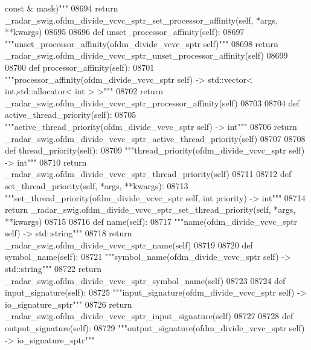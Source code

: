 \begin{DoxyCode}
{{{{{{{{{{{{{{{{{{{{{{{{{{{{{       const & mask)"""}
08694         \textcolor{keywordflow}{return} \_radar\_swig.ofdm\_divide\_vcvc\_sptr\_set\_processor\_affinity(self, *args, **kwargs)
08695 
08696     \textcolor{keyword}{def }unset_processor_affinity(self):
08697         \textcolor{stringliteral}{"""unset\_processor\_affinity(ofdm\_divide\_vcvc\_sptr self)"""}
08698         \textcolor{keywordflow}{return} \_radar\_swig.ofdm\_divide\_vcvc\_sptr\_unset\_processor\_affinity(self)
08699 
08700     \textcolor{keyword}{def }processor_affinity(self):
08701         \textcolor{stringliteral}{"""processor\_affinity(ofdm\_divide\_vcvc\_sptr self) -> std::vector< int,std::allocator< int > >"""}
08702         \textcolor{keywordflow}{return} \_radar\_swig.ofdm\_divide\_vcvc\_sptr\_processor\_affinity(self)
08703 
08704     \textcolor{keyword}{def }active_thread_priority(self):
08705         \textcolor{stringliteral}{"""active\_thread\_priority(ofdm\_divide\_vcvc\_sptr self) -> int"""}
08706         \textcolor{keywordflow}{return} \_radar\_swig.ofdm\_divide\_vcvc\_sptr\_active\_thread\_priority(self)
08707 
08708     \textcolor{keyword}{def }thread_priority(self):
08709         \textcolor{stringliteral}{"""thread\_priority(ofdm\_divide\_vcvc\_sptr self) -> int"""}
08710         \textcolor{keywordflow}{return} \_radar\_swig.ofdm\_divide\_vcvc\_sptr\_thread\_priority(self)
08711 
08712     \textcolor{keyword}{def }set_thread_priority(self, *args, **kwargs):
08713         \textcolor{stringliteral}{"""set\_thread\_priority(ofdm\_divide\_vcvc\_sptr self, int priority) -> int"""}
08714         \textcolor{keywordflow}{return} \_radar\_swig.ofdm\_divide\_vcvc\_sptr\_set\_thread\_priority(self, *args, **kwargs)
08715 
08716     \textcolor{keyword}{def }name(self):
08717         \textcolor{stringliteral}{"""name(ofdm\_divide\_vcvc\_sptr self) -> std::string"""}
08718         \textcolor{keywordflow}{return} \_radar\_swig.ofdm\_divide\_vcvc\_sptr\_name(self)
08719 
08720     \textcolor{keyword}{def }symbol_name(self):
08721         \textcolor{stringliteral}{"""symbol\_name(ofdm\_divide\_vcvc\_sptr self) -> std::string"""}
08722         \textcolor{keywordflow}{return} \_radar\_swig.ofdm\_divide\_vcvc\_sptr\_symbol\_name(self)
08723 
08724     \textcolor{keyword}{def }input_signature(self):
08725         \textcolor{stringliteral}{"""input\_signature(ofdm\_divide\_vcvc\_sptr self) -> io\_signature\_sptr"""}
08726         \textcolor{keywordflow}{return} \_radar\_swig.ofdm\_divide\_vcvc\_sptr\_input\_signature(self)
08727 
08728     \textcolor{keyword}{def }output_signature(self):
08729         \textcolor{stringliteral}{"""output\_signature(ofdm\_divide\_vcvc\_sptr self) -> io\_signature\_sptr"""}
}}}}}}}}}}}}}}}}}}}}}}}}}}}}
\end{DoxyCode}
